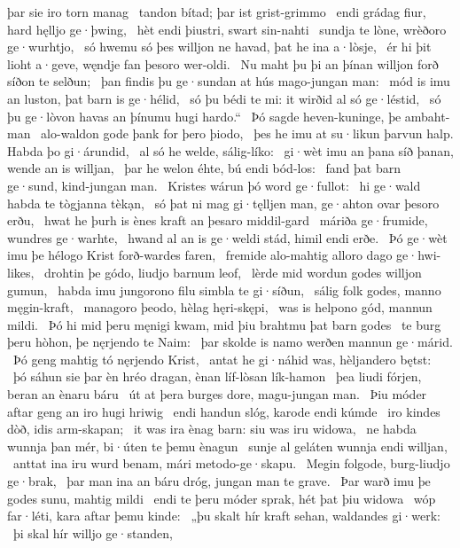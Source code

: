 þar sie iro torn manag \hld\ tandon bítad;
þar ist grist-grimmo \hld\ endi grádag fiur,
hard hęlljo ge·þwing, \hld\ hèt endi þiustri,
swart sin-nahti \hld\ sundja te lòne,
wrèðoro ge·wurhtjo, \hld\ só hwemu só þes willjon ne havad,
þat he ina a·lòsje, \hld\ ér hi þit lioht a·geve,
węndje fan þesoro wer-oldi. \hld\ Nu maht þu þi an þínan willjon forð
síðon te selðun; \hld\ þan findis þu ge·sundan at hús
mago-jungan man: \hld\ mód is imu an luston,
þat barn is ge·hélid, \hld\ só þu bédi te mi:
it wirðid al só ge·léstid, \hld\ só þu ge·lòvon havas
an þínumu hugi hardo.“ \hld\ Þó sagde heven-kuninge,
þe ambaht-man \hld\ alo-waldon gode
þank for þero þiodo, \hld\ þes he imu at su·likun þarvun halp.
Habda þo gi·árundid, \hld\ al só he welde,
sálig-líko: \hld\ gi·wèt imu an þana síð þanan,
wende an is willjan, \hld\ þar he welon éhte,
bú endi bód-los: \hld\ fand þat barn ge·sund,
kind-jungan man. \hld\ Kristes wárun þó
word ge·fullot: \hld\ hi ge·wald habda
te tògjanna tèkạn, \hld\ só þat ni mag gi·tęlljen man,
ge·ahton ovar þesoro erðu, \hld\ hwat he þurh is ènes kraft
an þesaro middil-gard \hld\ máriða ge·frumide,
wundres ge·warhte, \hld\ hwand al an is ge·weldi stád,
himil endi erðe. \hld\ Þó ge·wèt imu þe hélogo Krist
forð-wardes faren, \hld\ fremide alo-mahtig
alloro dago ge·hwi-likes, \hld\ drohtin þe gódo,
liudjo barnum leof, \hld\ lèrde mid wordun
godes willjon gumun, \hld\ habda imu jungorono filu
simbla te gi·síðun, \hld\ sálig folk godes,
manno męgin-kraft, \hld\ managoro þeodo,
hèlag hęri-skępi, \hld\ was is helpono gód,
mannun mildi. \hld\ Þó hi mid þeru męnigi kwam,
mid þiu brahtmu þat barn godes \hld\ te burg þeru hòhon,
þe nęrjendo te Naim: \hld\ þar skolde is namo werðen
mannun ge·márid. \hld\ Þó geng mahtig tó
nęrjendo Krist, \hld\ antat he gi·náhid was,
hèljandero bętst: \hld\ þó sáhun sie þar èn hréo dragan,
ènan líf-lòsan lík-hamon \hld\ þea liudi fórjen,
beran an ènaru báru \hld\ út at þera burges dore,
magu-jungan man. \hld\ Þiu móder aftar geng
an iro hugi hriwig \hld\ endi handun slóg,
karode endi kúmde \hld\ iro kindes dòð,
idis arm-skapan; \hld\ it was ira ènag barn:
siu was iru widowa, \hld\ ne habda wunnja þan mér,
bi·úten te þemu ènagun \hld\ sunje al geláten
wunnja endi willjan, \hld\ anttat ina iru wurd benam,
mári metodo-ge·skapu. \hld\ Megin folgode,
burg-liudjo ge·brak, \hld\ þar man ina an báru dróg,
jungan man te grave. \hld\ Þar warð imu þe godes sunu,
mahtig mildi \hld\ endi te þeru móder sprak,
hét þat þiu widowa \hld\ wóp far·léti,
kara aftar þemu kinde: \hld\ „þu skalt hír kraft sehan,
waldandes gi·werk: \hld\ þi skal hír willjo ge·standen,
